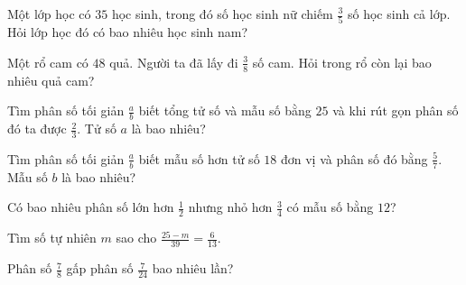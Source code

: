 \begin{ex}
  Một lớp học có $35$ học sinh, trong đó số học sinh nữ chiếm $\frac{3}{5}$ số học sinh cả lớp. Hỏi lớp học đó có bao nhiêu học sinh nam?
\end{ex}

\begin{ex}
  Một rổ cam có $48$ quả. Người ta đã lấy đi $\frac{3}{8}$ số cam. Hỏi trong rổ còn lại bao nhiêu quả cam?
\end{ex}

\begin{ex}
  Tìm phân số tối giản $\frac{a}{b}$ biết tổng tử số và mẫu số bằng $25$ và khi rút gọn phân số đó ta được $\frac{2}{3}$. Tử số $a$ là bao nhiêu?
\end{ex}

\begin{ex}
  Tìm phân số tối giản $\frac{a}{b}$ biết mẫu số hơn tử số $18$ đơn vị và phân số đó bằng $\frac{5}{7}$. Mẫu số $b$ là bao nhiêu?
\end{ex}

\begin{ex}
  Có bao nhiêu phân số lớn hơn $\frac{1}{2}$ nhưng nhỏ hơn $\frac{3}{4}$ có mẫu số bằng $12$?
\end{ex}

\begin{ex}
  Tìm số tự nhiên $m$ sao cho $\frac{25 - m}{39} = \frac{6}{13}$.
\end{ex}

\begin{ex}
  Phân số $\frac{7}{8}$ gấp phân số $\frac{7}{24}$ bao nhiêu lần?
\end{ex}

